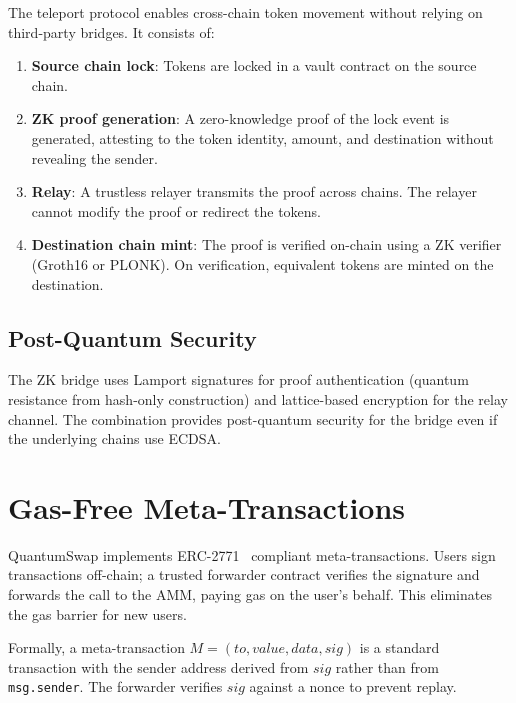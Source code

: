 \documentclass[11pt,a4paper]{article}
\begin{document}
The teleport protocol enables cross-chain token movement without
relying on third-party bridges. It consists of:

\begin{enumerate}[nosep]
  \item \textbf{Source chain lock}: Tokens are locked in a vault
        contract on the source chain.
  \item \textbf{ZK proof generation}: A zero-knowledge proof of the
        lock event is generated, attesting to the token identity,
        amount, and destination without revealing the sender.
  \item \textbf{Relay}: A trustless relayer transmits the proof across
        chains. The relayer cannot modify the proof or redirect the
        tokens.
  \item \textbf{Destination chain mint}: The proof is verified
        on-chain using a ZK verifier (Groth16 or PLONK). On
        verification, equivalent tokens are minted on the destination.
\end{enumerate}

\subsection{Post-Quantum Security}

The ZK bridge uses Lamport signatures for proof authentication (quantum
resistance from hash-only construction) and lattice-based encryption
for the relay channel. The combination provides post-quantum security
for the bridge even if the underlying chains use ECDSA.

\section{Gas-Free Meta-Transactions}

QuantumSwap implements ERC-2771~\cite{erc2771} compliant
meta-transactions. Users sign transactions off-chain; a trusted
forwarder contract verifies the signature and forwards the call to the
AMM, paying gas on the user's behalf. This eliminates the gas barrier
for new users.

Formally, a meta-transaction $M = (\mathit{to}, \mathit{value},
\mathit{data}, \mathit{sig})$ is a standard transaction with the sender
address derived from $\mathit{sig}$ rather than from \texttt{msg.sender}.
The forwarder verifies $\mathit{sig}$ against a nonce to prevent replay.
\end{document}
